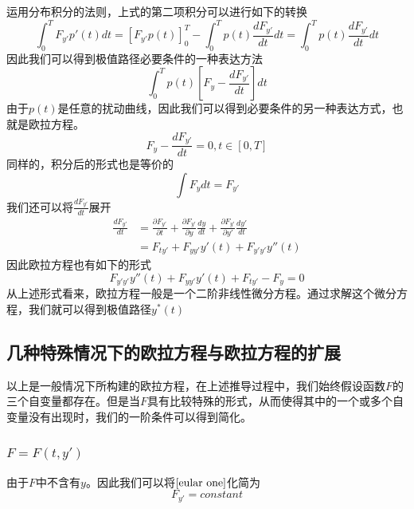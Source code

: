 \documentclass[UTF8,12pt]{ctexart}
\numberwithin{equation}{section} %
\numberwithin{figure}{section}
\numberwithin{table}{section}
\begin{document}
	运用分布积分的法则，上式的第二项积分可以进行如下的转换
	\begin{equation}
		\int_{0}^{T}F_{y'} p'(t)dt = [F_{y'}p(t)]^T_0 - \int_{0}^{T}p(t)\frac{dF_{y'}}{dt}dt = \int_{0}^{T}p(t)\frac{dF_{y'}}{dt}dt
	\end{equation}
	因此我们可以得到极值路径必要条件的一种表达方法
	\begin{equation}
		\int_{0}^{T}p(t)[F_y - \frac{dF_{y'}}{dt}]dt
	\end{equation}
	由于$p(t)$是任意的扰动曲线，因此我们可以得到必要条件的另一种表达方式，也就是欧拉方程。
	\begin{equation}
		F_y - \frac{dF_{y'}}{dt} = 0,t \in[0,T] \label{eular one}
	\end{equation}
	同样的，积分后的形式也是等价的
	\begin{equation}
		\int F_y dt = F_{y'}
	\end{equation}
	我们还可以将$\frac{dF_{y'}}{dt}$展开
	\begin{equation}
		\begin{aligned}
			\frac{dF_{y'}}{dt} &= \frac{\partial F_{y'}}{\partial t} + \frac{\partial F_{y'}}{\partial y}\frac{dy}{dt} + \frac{\partial F_{y'}}{\partial y'}\frac{dy'}{dt} \\
			&= F_{ty'} + F_{yy'}y'(t) + F_{y'y'}y''(t)
		\end{aligned}
	\end{equation}
	因此欧拉方程也有如下的形式
	\begin{equation}
		F_{y'y'}y''(t) + F_{yy'}y'(t) + F_{ty'} - F_y = 0 \label{eular two}
	\end{equation}
	从上述形式看来，欧拉方程一般是一个二阶非线性微分方程。通过求解这个微分方程，我们就可以得到极值路径$y^*(t)$
	
	\subsection{几种特殊情况下的欧拉方程与欧拉方程的扩展}
	以上是一般情况下所构建的欧拉方程，在上述推导过程中，我们始终假设函数$F$的三个自变量都存在。但是当$F$具有比较特殊的形式，从而使得其中的一个或多个自变量没有出现时，我们的一阶条件可以得到简化。
	
	\subsubsection{$F = F(t,y')$}
	由于$F$中不含有$y$。因此我们可以将$\ref{eular one}$化简为
	\begin{equation}
		F_{y'} = constant
	\end{equation}
	
\end{document}
